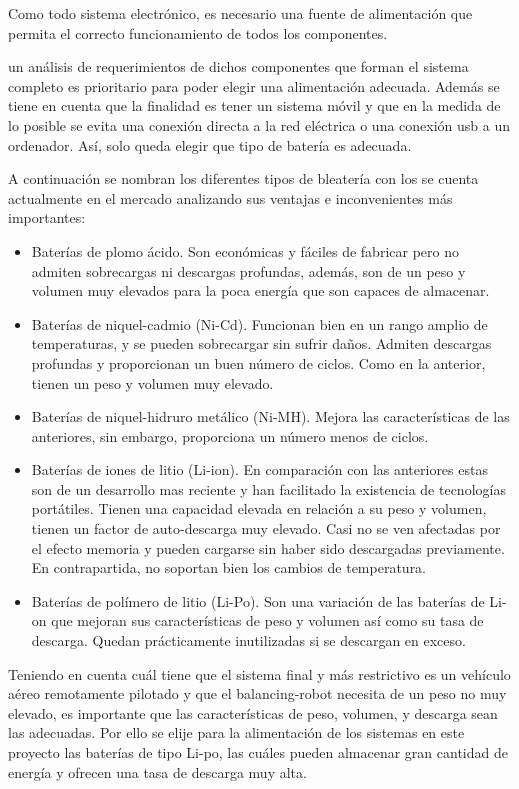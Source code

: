 Como todo sistema electrónico, es necesario una fuente de alimentación que permita el correcto funcionamiento de todos los componentes.  \newline

un análisis de requerimientos de dichos componentes que forman el sistema completo es prioritario para poder elegir una alimentación adecuada. Además se tiene en cuenta que la finalidad es tener un sistema móvil y que en la medida de lo posible se evita una conexión directa a la red eléctrica o una conexión usb a un ordenador. Así, solo queda elegir que tipo de batería es adecuada. \newline

A continuación se nombran los diferentes tipos de bleatería con los se cuenta actualmente en el mercado analizando sus ventajas e inconvenientes más importantes: 

\begin{itemize}
	\item Baterías de plomo ácido. Son económicas y fáciles de fabricar pero no admiten sobrecargas ni descargas profundas, además, son de un peso y volumen muy elevados para la poca energía que son capaces de almacenar.
	\item Baterías de niquel-cadmio (Ni-Cd). Funcionan bien en un rango amplio de temperaturas, y se pueden sobrecargar sin sufrir daños. Admiten descargas profundas y proporcionan un buen número de ciclos. Como en la anterior, tienen un peso y volumen muy elevado.
	\item Baterías de niquel-hidruro metálico (Ni-MH). Mejora las características de las anteriores, sin embargo, proporciona un número menos de ciclos.
	\item Baterías de iones de litio (Li-ion). En comparación con las anteriores estas son de un desarrollo mas reciente y han facilitado la existencia de tecnologías portátiles. Tienen una capacidad elevada en relación a su peso y volumen, tienen un factor de auto-descarga muy elevado. Casi no se ven afectadas por el efecto memoria y pueden cargarse sin haber sido descargadas previamente. En contrapartida, no soportan bien los cambios de temperatura. 
	\item Baterías de polímero de litio (Li-Po). Son una variación de las baterías de Li-on que mejoran sus características de peso y volumen así como su tasa de descarga. Quedan prácticamente inutilizadas si se descargan en exceso.
\end{itemize}

Teniendo en cuenta cuál tiene que el sistema final y más restrictivo es un vehículo aéreo remotamente pilotado y que el balancing-robot necesita de un peso no muy elevado, es importante que las características de peso, volumen, y descarga sean las adecuadas. Por ello se elije para la alimentación de los sistemas en este proyecto las baterías de tipo Li-po, las cuáles pueden almacenar gran cantidad de energía y ofrecen una tasa de descarga muy alta. \newline

